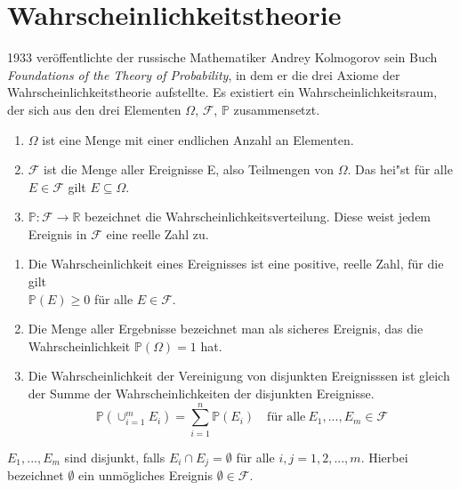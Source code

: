 \section{Wahrscheinlichkeitstheorie}


\vspace{15pt}


1933 ver\"offentlichte der russische Mathematiker Andrey Kolmogorov sein Buch \textit{Foundations of the Theory of Probability}, in dem er die drei Axiome der Wahrscheinlichkeitstheorie aufstellte. Es existiert ein Wahrscheinlichkeitsraum, der sich aus den drei Elementen $\Omega$, $\mathcal{F}$, $\mathbb{P}$ zusammensetzt.

\vspace{5pt}

\begin{enumerate}
	\item $\Omega$ ist eine Menge mit einer endlichen Anzahl an Elementen.
	\item $\mathcal{F}$ ist die Menge aller Ereignisse E, also Teilmengen von $\Omega$. Das hei"st f\"ur alle $E \in \mathcal{F}$ gilt $E \subseteq \Omega$.
	\item $\mathbb{P}: \mathcal{F} \rightarrow \mathbb{R}$ bezeichnet die Wahrscheinlichkeitsverteilung. Diese weist jedem Ereignis in $\mathcal{F}$ eine reelle Zahl zu.  
	
	
\end{enumerate}

\vspace{10pt}



\begin{Def}

\vspace{5pt}

\begin{enumerate}
	\item Die Wahrscheinlichkeit eines Ereignisses ist eine positive, reelle Zahl, f\"ur die gilt \\ $\mathbb{P} (E) \geq 0$ f\"ur alle $E \in \mathcal{F}$.
	\item Die Menge aller Ergebnisse bezeichnet man als sicheres Ereignis, das die Wahrscheinlichkeit $\mathbb{P} (\Omega) = 1$ hat.
	\item Die Wahrscheinlichkeit der Vereinigung von disjunkten Ereignisssen ist gleich der Summe der Wahrscheinlichkeiten der disjunkten Ereignisse. 
	\vspace{3pt}
	\begin{equation*}
	\mathbb{P} (\cup_{i=1}^m E_{i}) = \sum_{i=1}^n \mathbb{P} (E_{i}) \quad \text{f\"ur alle} \: E_{1},...,E_{m} \in \mathcal{F}
	\end{equation*}
\end{enumerate}
\vspace{5pt}

$E_{1},...,E_{m}$ sind disjunkt, falls $E_{i} \cap E_{j} = \emptyset$ f\"ur alle $i,j= 1,2,...,m$. 
Hierbei bezeichnet $\emptyset$ ein unm\"ogliches Ereignis $\emptyset \in \mathcal{F}$.
\end{Def}

